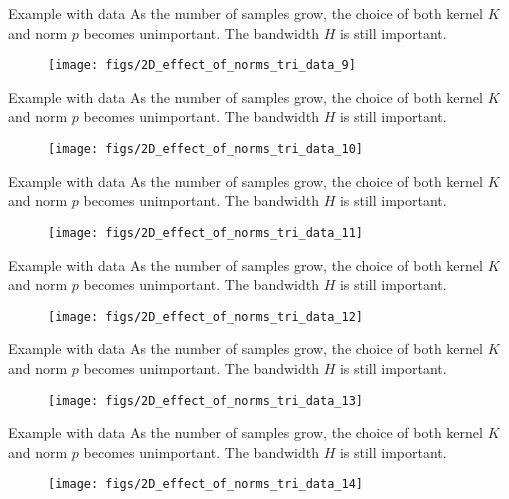 \documentclass[11pt, aspectratio=149]{beamer}
\theoremstyle{plain}
\begin{document}
\begin{frame}[fragile, t]{Example with data}
	As the number of samples grow, the choice of both kernel $K$ and norm $p$ becomes unimportant. The bandwidth $H$ is still important.
	\vfill
	\begin{figure}
		\centering
		\texttt{[image: figs/2D\_effect\_of\_norms\_tri\_data\_9]}
	\end{figure}
\end{frame}


\begin{frame}[fragile, t]{Example with data}
	As the number of samples grow, the choice of both kernel $K$ and norm $p$ becomes unimportant. The bandwidth $H$ is still important.
	\vfill
	\begin{figure}
		\centering
		\texttt{[image: figs/2D\_effect\_of\_norms\_tri\_data\_10]}
	\end{figure}
\end{frame}


\begin{frame}[fragile, t]{Example with data}
	As the number of samples grow, the choice of both kernel $K$ and norm $p$ becomes unimportant. The bandwidth $H$ is still important.
	\vfill
	\begin{figure}
		\centering
		\texttt{[image: figs/2D\_effect\_of\_norms\_tri\_data\_11]}
	\end{figure}
\end{frame}


\begin{frame}[fragile, t]{Example with data}
	As the number of samples grow, the choice of both kernel $K$ and norm $p$ becomes unimportant. The bandwidth $H$ is still important.
	\vfill
	\begin{figure}
		\centering
		\texttt{[image: figs/2D\_effect\_of\_norms\_tri\_data\_12]}
	\end{figure}
\end{frame}


\begin{frame}[fragile, t]{Example with data}
	As the number of samples grow, the choice of both kernel $K$ and norm $p$ becomes unimportant. The bandwidth $H$ is still important.
	\vfill
	\begin{figure}
		\centering
		\texttt{[image: figs/2D\_effect\_of\_norms\_tri\_data\_13]}
	\end{figure}
\end{frame}


\begin{frame}[fragile, t]{Example with data}
	As the number of samples grow, the choice of both kernel $K$ and norm $p$ becomes unimportant. The bandwidth $H$ is still important.
	\vfill
	\begin{figure}
		\centering
		\texttt{[image: figs/2D\_effect\_of\_norms\_tri\_data\_14]}
	\end{figure}
\end{frame}
\end{document}
